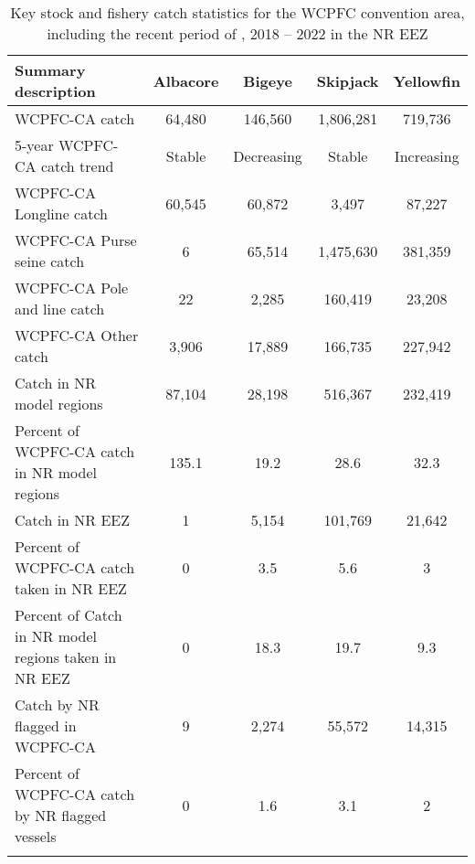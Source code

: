 \begin{longtable}{lcccc}
\caption{Key stock and fishery catch statistics for the WCPFC convention area, including the recent period of , 2018 -- 2022 in the NR EEZ} \\ 
  \hline
Summary description & Albacore & Bigeye & Skipjack & Yellowfin \\ 
  \hline
WCPFC-CA catch & 64,480 & 146,560 & 1,806,281 & 719,736 \\ 
  5-year WCPFC-CA catch trend & Stable & Decreasing & Stable & Increasing \\ 
  WCPFC-CA Longline catch & 60,545 & 60,872 & 3,497 & 87,227 \\ 
  WCPFC-CA Purse seine catch & 6 & 65,514 & 1,475,630 & 381,359 \\ 
  WCPFC-CA Pole and line catch & 22 & 2,285 & 160,419 & 23,208 \\ 
  WCPFC-CA Other catch & 3,906 & 17,889 & 166,735 & 227,942 \\ 
  Catch in NR model regions & 87,104 & 28,198 & 516,367 & 232,419 \\ 
  Percent of WCPFC-CA catch in NR model regions & 135.1 & 19.2 & 28.6 & 32.3 \\ 
   \hline
Catch in NR EEZ & 1 & 5,154 & 101,769 & 21,642 \\ 
  Percent of WCPFC-CA catch taken in NR EEZ & 0 & 3.5 & 5.6 & 3 \\ 
  Percent of Catch in NR model regions taken in NR EEZ & 0 & 18.3 & 19.7 & 9.3 \\ 
  Catch by NR flagged in WCPFC-CA & 9 & 2,274 & 55,572 & 14,315 \\ 
  Percent of WCPFC-CA catch by NR flagged vessels & 0 & 1.6 & 3.1 & 2 \\ 
  \hline
\label{cat_sum_tab}
\end{longtable}
